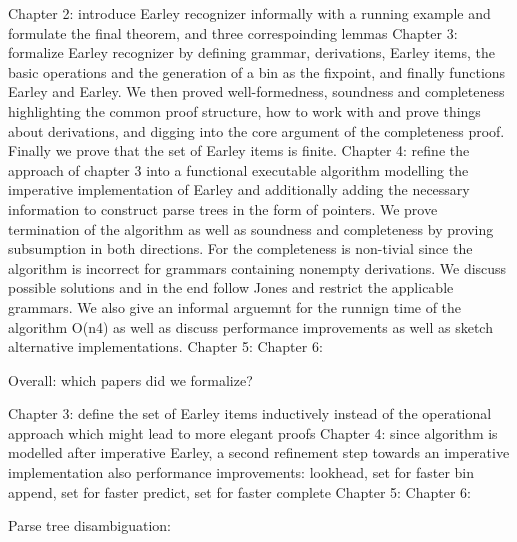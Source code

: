 %
\begin{isabellebody}%
%
%
\isadelimtheory
%
\endisadelimtheory
%
\isatagtheory
%
\endisatagtheory
{\isafoldtheory}%
%
\isadelimtheory
%
\endisadelimtheory
%
\isadelimdocument
%
\endisadelimdocument
%
\isatagdocument
%
\isamarkuptrue%
%
\isamarkuptrue%
%
\endisatagdocument
{\isafolddocument}%
%
\isadelimdocument
%
\endisadelimdocument
%
\begin{isamarkuptext}%
Chapter 2: introduce Earley recognizer informally with a running example and formulate the final theorem, and three correspoinding lemmas
Chapter 3: formalize Earley recognizer by defining grammar, derivations, Earley items, the basic operations and the generation of a bin
  as the fixpoint, and finally functions Earley and Earley. We then proved well-formedness, soundness and completeness highlighting
  the common proof structure, how to work with and prove things about derivations, and digging into the core argument of the completeness
  proof. Finally we prove that the set of Earley items is finite.
Chapter 4: refine the approach of chapter 3 into a functional executable algorithm modelling the imperative implementation of Earley and
  additionally adding the necessary information to construct parse trees in the form of pointers. We prove termination of the algorithm
  as well as soundness and completeness by proving subsumption in both directions. For the completeness is non-tivial since the algorithm
  is incorrect for grammars containing nonempty derivations. We discuss possible solutions and in the end follow Jones and restrict the
  applicable grammars. We also give an informal arguemnt for the runnign time of the algorithm O(n4) as well as discuss performance improvements as well as
  sketch alternative implementations.
Chapter 5:
Chapter 6:

Overall: which papers did we formalize?%
\end{isamarkuptext}\isamarkuptrue%
%
\isadelimdocument
%
\endisadelimdocument
%
\isatagdocument
%
\isamarkuptrue%
%
\endisatagdocument
{\isafolddocument}%
%
\isadelimdocument
%
\endisadelimdocument
%
\begin{isamarkuptext}%
Chapter 3: define the set of Earley items inductively instead of the operational approach which might lead to more elegant proofs
Chapter 4: since algorithm is modelled after imperative Earley, a second refinement step towards an imperative implementation
  also performance improvements: lookhead, set for faster bin append, set for faster predict, set for faster complete
Chapter 5:
Chapter 6:%
\end{isamarkuptext}\isamarkuptrue%
%
\begin{isamarkuptext}%
Parse tree disambiguation:


\end{isamarkuptext}
\end{isabellebody}

